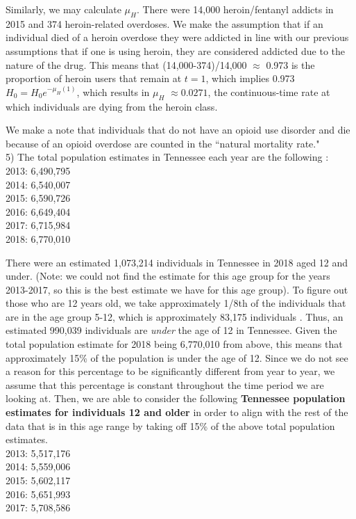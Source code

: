\documentclass[12pt]{article}
\begin{document}
Similarly, we may calculate $\mu_{H}$. There were 14,000 heroin/fentanyl addicts in 2015 and 374 heroin-related overdoses. We make the assumption that if an individual died of a heroin overdose they were addicted in line with our previous assumptions that if one is using heroin, they are considered addicted due to the nature of the drug. This means that (14,000-374)/14,000 $\approx$ 0.973 is the proportion of heroin users that remain at $t=1$, which implies 0.973$H_0=H_0 e^{-\mu_{H}(1)}$, which results in $\mu_{H}$ $\approx 0.0271$, the continuous-time rate at which individuals are dying from the heroin class.


We make a note that individuals that do not have an opioid use disorder and die because of an opioid overdose are counted in the ``natural mortality rate." \\

5) The total population estimates in Tennessee each year are the following \cite{USCensus}: \\
2013: 6,490,795 \\
2014: 6,540,007 \\
2015: 6,590,726 \\
2016: 6,649,404 \\
2017: 6,715,984 \\
2018: 6,770,010 

There were an estimated 1,073,214 individuals in Tennessee in 2018 aged 12 and under. (Note: we could not find the estimate for this age group for the years 2013-2017, so this is the best estimate we have for this age group). To figure out those who are 12 years old, we take approximately 1/8th of the individuals that are in the age group 5-12, which is approximately 83,175 individuals \cite{DOHHS}. Thus, an estimated 990,039 individuals are \emph{under} the age of 12 in Tennessee. Given the total population estimate for 2018 being 6,770,010 from above, this means that approximately 15\% of the population is under the age of 12. Since we do not see a reason for this percentage to be significantly different from year to year, we assume that this percentage is constant throughout the time period we are looking at. Then, we are able to consider the following \textbf{Tennessee population estimates for individuals 12 and older} in order to align with the rest of the data that is in this age range by taking off 15\% of the above total population estimates.  \\
2013: 5,517,176 \\
2014: 5,559,006 \\
2015: 5,602,117 \\
2016: 5,651,993 \\
2017: 5,708,586 
\end{document}
